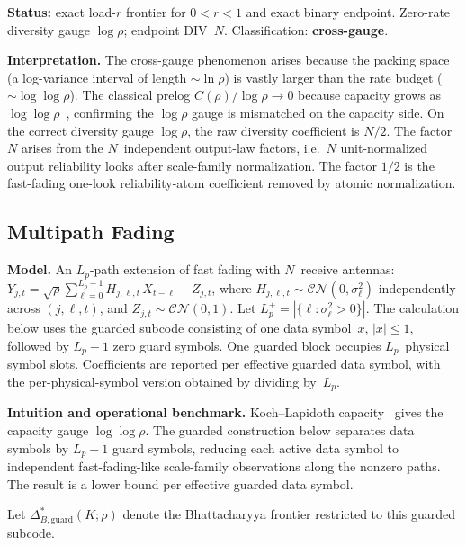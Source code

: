 \documentclass[lettersize,onecolumn]{IEEEtran}
\newcommand{\snr}{\rho}
\begin{document}
\textbf{Status:} exact load-$r$ frontier for $0 < r < 1$ and exact
binary endpoint. Zero-rate diversity gauge $\log\snr$; endpoint
DIV~$N$. Classification: \textbf{cross-gauge}.

\textbf{Interpretation.}
The cross-gauge phenomenon arises because the packing space (a
log-variance interval of length $\sim\ln\snr$) is vastly larger than
the rate budget ($\sim\log\log\snr$). The classical prelog
$C(\snr)/\log\snr \to 0$ because capacity grows as
$\log\log\snr$~\cite{LapidothMoser2003}, confirming the $\log\snr$
gauge is mismatched on the capacity side. On the correct diversity
gauge $\log\snr$, the raw diversity coefficient is $N/2$. The factor $N$ arises from the $N$~independent output-law factors,
i.e.\ $N$ unit-normalized output reliability looks after scale-family
normalization. The factor $1/2$ is the fast-fading one-look
reliability-atom coefficient removed by atomic normalization.

\subsection{Multipath Fading}\label{subsec:ch_multipath}

\textbf{Model.}
An $L_p$-path extension of fast fading with $N$~receive antennas:
$Y_{j,t} = \sqrt{\snr}\sum_{\ell=0}^{L_p-1}
H_{j,\ell,t}\,X_{t-\ell} + Z_{j,t}$, where
$H_{j,\ell,t}\sim\mathcal{CN}(0,\sigma_\ell^2)$ independently across
$(j,\ell,t)$, and $Z_{j,t}\sim\mathcal{CN}(0,1)$. Let
$L_p^+ = |\{\ell : \sigma_\ell^2 > 0\}|$.
The calculation below uses the guarded subcode consisting of one data
symbol~$x$, $|x| \le 1$, followed by $L_p-1$ zero guard symbols. One
guarded block occupies $L_p$~physical symbol slots. Coefficients are
reported per effective guarded data symbol, with the per-physical-symbol
version obtained by dividing by~$L_p$.

\textbf{Intuition and operational benchmark.}
Koch--Lapidoth capacity~\cite{KochLapidoth2009} gives the capacity
gauge $\log\log\snr$. The guarded construction below separates data
symbols by $L_p-1$ guard symbols, reducing each active data symbol to
independent fast-fading-like scale-family observations along the
nonzero paths. The result is a lower bound per effective guarded data
symbol.

Let $\Delta_{B,\mathrm{guard}}^*(K;\snr)$ denote the Bhattacharyya
frontier restricted to this guarded subcode.
\end{document}
